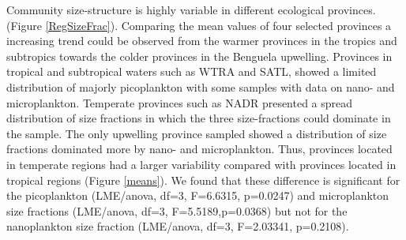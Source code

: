 Community size-structure is highly variable in different ecological provinces. (Figure \ref{RegSizeFrac}). Comparing the mean values of four selected provinces a increasing trend could be observed from the warmer provinces in the tropics and subtropics towards the colder provinces in the Benguela upwelling. Provinces in tropical and subtropical waters such as WTRA and SATL, showed a limited distribution of majorly picoplankton with some samples with data on nano- and microplankton. Temperate provinces such as NADR presented a spread distribution of size fractions in which the three size-fractions could dominate in the sample. The only upwelling province sampled showed a distribution of size fractions dominated more by nano- and microplankton. Thus, provinces located in temperate regions had a larger variability compared with provinces located in tropical regions (Figure \ref{means}). We found that these difference is significant for the picoplankton (LME/anova, df=3, F=6.6315, p=0.0247) and microplankton size fractions (LME/anova, df=3, F=5.5189,p=0.0368) but not for the nanoplankton size fraction (LME/anova, df=3, F=2.03341, p=0.2108).

